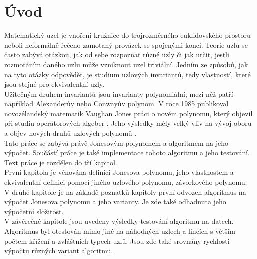 \chapter*{Úvod}

Matematický uzel je vnoření kružnice do trojrozměrného euklidovského prostoru neboli neformálně řečeno zamotaný provázek se spojenými konci. Teorie uzlů se často zabývá otázkou, jak od sebe rozpoznat různé uzly či jak určit, jestli rozmotáním daného uzlu může vzniknout uzel triviální. Jedním ze způsobů, jak na tyto otázky odpovědět, je studium uzlových invariantů, tedy vlastností, které jsou stejné pro ekvivalentní uzly.
\\
Užitečným druhem invariantů jsou invarianty polynomiální, mezi něž patří například Alexanderův nebo	 Conwayův polynom. 
V roce 1985 publikoval novozélandský matematik Vaughan Jones práci o novém polynomu, který objevil při studiu operátorových algeber  \cite{jones1985}. 
Jeho výsledky měly velký vliv na vývoj oboru a objev nových druhů uzlových polynomů \cite{cromwell2004knots}.
\\
Tato práce se zabývá právě Jonesovým polynomem a algoritmem na jeho výpočet. Součástí práce je také implementace tohoto algoritmu a jeho testování.
\\
Text práce je rozdělen do tří kapitol. 
\\
První kapitola je věnována definici Jonesova polynomu, jeho vlastnostem a ekvivalentní definici pomocí jiného uzlového polynomu, závorkového polynomu.
\\
V druhé kapitole je na základě poznatků kapitoly první odvozen algoritmus na výpočet Jonesova polynomu a jeho varianty. Je zde také odhadnuta jeho výpočetní složitost.
\\
V závěrečné kapitole jsou uvedeny výsledky testování algoritmu na datech. Algoritmus byl otestován mimo jiné na náhodných uzlech a lincích s větším počtem křížení a zvláštních typech uzlů. Jsou zde také srovnány rychlosti výpočtu různých variant algoritmu.


